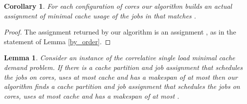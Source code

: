 \documentclass[11pt]{article}
\newtheorem{corollary}[theorem]{Corollary}
\newtheorem{lemma}[theorem]{Lemma}
\begin{document}
\begin{corollary}\label{actual_opt_ident}
For each configuration of cores  our algorithm builds an actual assignment of minimal cache usage of the jobs in  that matches .
\end{corollary}
\begin{proof}
The assignment returned by our algorithm is an assignment , as in the statement of Lemma \ref{by_order}.
\end{proof}

\begin{lemma}\label{ptas_aprx_dcsn}
Consider an instance of the correlative single load minimal cache demand problem.
If there is a cache partition and job assignment that schedules the jobs on  cores, uses at most  cache and has a makespan of at most  then our algorithm finds a cache partition and job assignment that schedules the jobs on  cores, uses at most  cache and has a makespan of at most .
\end{lemma}
\end{document}

